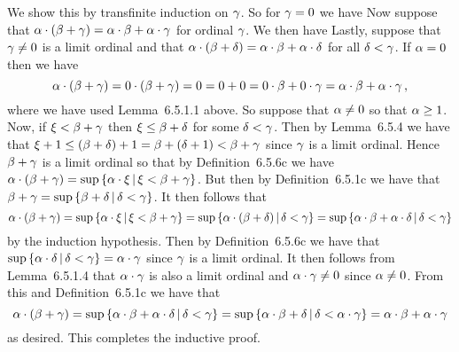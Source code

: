 \begin{solution}
	We show this by transfinite induction on $\gamma$.
    So  for $\gamma = 0$ we have
    Now suppose that $\alpha \cdot (\beta + \gamma) = \alpha \cdot \beta + \alpha \cdot \gamma$ for ordinal $\gamma$.
    We then have
    Lastly, suppose that $\gamma \neq 0$ is a limit ordinal and that $\alpha \cdot (\beta + \delta) = \alpha \cdot \beta + \alpha \cdot \delta$ for all $\delta < \gamma$.
    If $\alpha = 0$ then we have
    $$
    \alpha \cdot (\beta + \gamma) = 0 \cdot (\beta + \gamma) = 0 = 0 + 0 = 0 \cdot \beta + 0 \cdot \gamma = \alpha \cdot \beta + \alpha \cdot \gamma \,,
    $$
    where we have used Lemma~6.5.1.1 above.
    So suppose that $\alpha \neq 0$ so that $\alpha \geq 1$.
    Now, if $\xi < \beta  + \gamma$ then $\xi \leq \beta + \delta$ for some $\delta < \gamma$.
    Then by Lemma~6.5.4 we have that $\xi + 1 \leq (\beta + \delta) + 1 = \beta + (\delta+1) < \beta + \gamma$ since $\gamma$ is a limit ordinal.
    Hence $\beta + \gamma$ is a limit ordinal so that by Definition~6.5.6c we have $\alpha \cdot (\beta + \gamma) = \sup\left\{ \alpha \cdot \xi \,|\, \xi < \beta + \gamma \right\}$.
    But then by Definition~6.5.1c we have that $\beta + \gamma = \sup\left\{ \beta + \delta \,|\, \delta < \gamma \right\}$.
    It then follows that
    $$
    \alpha \cdot (\beta + \gamma) = \sup\left\{ \alpha \cdot \xi \,|\, \xi < \beta + \gamma \right\} = \sup\left\{ \alpha \cdot (\beta + \delta) \,|\, \delta < \gamma \right\}
    = \sup\left\{ \alpha \cdot \beta + \alpha \cdot \delta \,|\, \delta < \gamma \right\}
    $$
    by the induction hypothesis.
    Then by Definition~6.5.6c we have that $\sup\left\{ \alpha \cdot \delta \,|\, \delta < \gamma \right\} = \alpha \cdot \gamma$ since $\gamma$ is a limit ordinal.
    It then follows from Lemma~6.5.1.4 that $\alpha \cdot \gamma$ is also a limit ordinal and $\alpha \cdot \gamma \neq 0$ since $\alpha \neq 0$.
    From  this and Definition~6.5.1c we have that
    $$
    \alpha \cdot (\beta + \gamma) = \sup\left\{ \alpha \cdot \beta + \alpha \cdot \delta \,|\, \delta < \gamma \right\} = \sup\left\{ \alpha \cdot \beta + \delta \,|\, \delta < \alpha \cdot \gamma \right\}
    = \alpha \cdot \beta + \alpha \cdot \gamma
    $$
    as desired.
    This completes the inductive proof. \qedsymbol
\end{solution}

